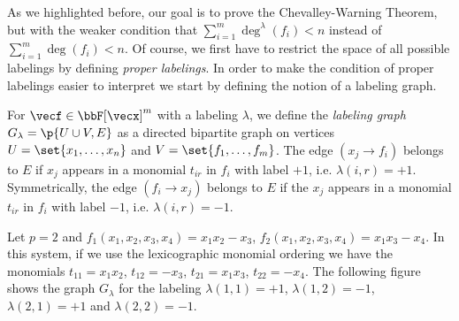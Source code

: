   As we highlighted before, our goal is to prove the Chevalley-Warning
Theorem, but with the weaker condition that
$\sum_{i = 1}^m \deg^{\lambda}(f_{i}) < n$ instead of
$\sum_{i = 1}^m \deg(f_i) < n$. Of course, we first have to restrict the
space of all possible labelings by defining {\em proper labelings}.
In order to make the condition of proper labelings easier to interpret
we start by defining the notion of a labeling graph.

\begin{definition} \label{def:labelingGraph}
  For $\vecf \in \bbF[\vecx]^m$ with a labeling $\lambda$, we define the
  \textit{labeling graph} $G_{\lambda} = \p{U \cup V, E}$ as a
  directed bipartite graph on vertices
  $U = \set{x_1, \dots, x_n}$ and $V=\set{f_1, \dots, f_m}$. The edge
  $(x_j \to f_i)$ belongs to $E$ if $x_j$ appears in a monomial
  $t_{i r}$ in $f_i$ with label $+1$, i.e. $\lambda(i, r) = +1$. Symmetrically, the edge
  $(f_i \to x_j)$ belongs to $E$ if the $x_j$ appears in a monomial
  $t_{i r}$ in $f_i$ with label $-1$, i.e. $\lambda(i, r) = -1$.
\end{definition}

 Let $p = 2$ and
$f_1(x_1, x_2, x_3, x_4) = x_1 x_2 - x_3$,
$f_2(x_1, x_2, x_3, x_4) = x_1 x_3 - x_4$. In this system, if we use the
lexicographic monomial ordering we have the monomials
$t_{1 1} = x_1 x_2$,
$t_{1 2} = - x_3$, $t_{2 1} = x_1 x_3$, $t_{2 2} = - x_4$. The following
figure shows the graph $G_{\lambda}$ for the labeling
$\lambda(1, 1) = +1$, $\lambda(1, 2) = -1$, $\lambda(2, 1) = +1$ and
$\lambda(2, 2) = -1$.

\begin{center}
\end{center}


